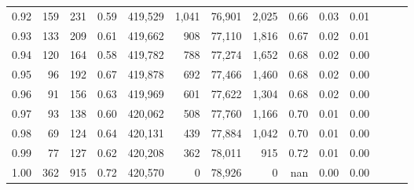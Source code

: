 \begin{tabular}{rrrrrrrrrrrrrr}
0.92 &    159 &    231 &  0.59 &  419,529 &    1,041 &  76,901 &   2,025 &  0.66 &  0.03 &      0.01 \\
0.93 &    133 &    209 &  0.61 &  419,662 &      908 &  77,110 &   1,816 &  0.67 &  0.02 &      0.01 \\
0.94 &    120 &    164 &  0.58 &  419,782 &      788 &  77,274 &   1,652 &  0.68 &  0.02 &      0.00 \\
0.95 &     96 &    192 &  0.67 &  419,878 &      692 &  77,466 &   1,460 &  0.68 &  0.02 &      0.00 \\
0.96 &     91 &    156 &  0.63 &  419,969 &      601 &  77,622 &   1,304 &  0.68 &  0.02 &      0.00 \\
0.97 &     93 &    138 &  0.60 &  420,062 &      508 &  77,760 &   1,166 &  0.70 &  0.01 &      0.00 \\
0.98 &     69 &    124 &  0.64 &  420,131 &      439 &  77,884 &   1,042 &  0.70 &  0.01 &      0.00 \\
0.99 &     77 &    127 &  0.62 &  420,208 &      362 &  78,011 &     915 &  0.72 &  0.01 &      0.00 \\
1.00 &    362 &    915 &  0.72 &  420,570 &        0 &  78,926 &       0 &   nan &  0.00 &      0.00 \\
\bottomrule
\end{tabular}
